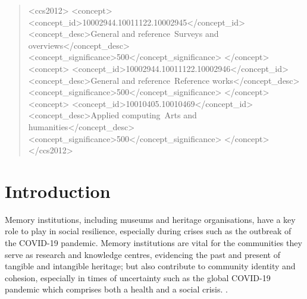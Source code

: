 \documentclass{egpubl}
\begin{document}
\begin{abstract}

\begin{CCSXML}
<ccs2012>
   <concept>
       <concept_id>10002944.10011122.10002945</concept_id>
       <concept_desc>General and reference~Surveys and overviews</concept_desc>
       <concept_significance>500</concept_significance>
       </concept>
   <concept>
       <concept_id>10002944.10011122.10002946</concept_id>
       <concept_desc>General and reference~Reference works</concept_desc>
       <concept_significance>500</concept_significance>
       </concept>
   <concept>
       <concept_id>10010405.10010469</concept_id>
       <concept_desc>Applied computing~Arts and humanities</concept_desc>
       <concept_significance>500</concept_significance>
       </concept>
 </ccs2012>
\end{CCSXML}


\printccsdesc   
\end{abstract}  
\section{Introduction}
\label{intro}
Memory institutions, including museums and heritage organisations, have a key role to play in social resilience, especially during crises such as the outbreak of the COVID-19 pandemic. Memory institutions are vital for the communities they serve as research and knowledge centres, evidencing the past and present of tangible and intangible heritage; but also contribute to community identity and cohesion, especially in times of uncertainty such as the global COVID-19 pandemic which comprises both a health and a social crisis. \cite{ICOM:2020}.
\end{document}
